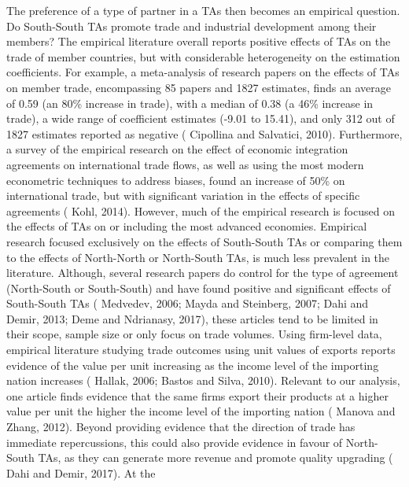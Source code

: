 \documentclass[12pt]{article}%
\begin{document}
%
The preference of a type of partner in a TAs then becomes an empirical
question. Do South-South TAs promote trade and industrial development
among their members? The empirical literature overall reports positive
effects of TAs on the trade of member countries, but with considerable
heterogeneity on the estimation coefficients. For example, a
meta-analysis of research papers on the effects of TAs on member trade,
encompassing 85 papers and 1827 estimates, finds an average of 0.59 (an
80\% increase in trade), with a median of 0.38 (a 46\% increase in
trade), a wide range of coefficient estimates (-9.01 to 15.41), and only
312 out of 1827 estimates reported as negative (\cite{cipollina_reciprocal_2010} Cipollina and Salvatici,
2010). Furthermore, a survey of the empirical research on the effect of
economic integration agreements on international trade flows, as well as
using the most modern econometric techniques to address biases, found an
increase of 50\% on international trade, but with significant variation
in the effects of specific agreements (\cite{kohl_we_2014} Kohl, 2014). However, much of the
empirical research is focused on the effects of TAs on or including the
most advanced economies. Empirical research focused exclusively on the
effects of South-South TAs or comparing them to the effects of
North-North or North-South TAs, is much less prevalent in the
literature. Although, several research papers do control for the type of
agreement (North-South or South-South) and have found positive and
significant effects of South-South TAs (\cite{medvedev_preferential_2006} Medvedev, 2006; \cite{mayda_south-south_2007} Mayda and
Steinberg, 2007; \cite{dahi_preferential_2013} Dahi and Demir, 2013; \cite{deme_trade-creation_2017} Deme and Ndrianasy, 2017), these
articles tend to be limited in their scope, sample size or only focus on
trade volumes. Using firm-level data, empirical literature studying
trade outcomes using unit values of exports reports evidence of the
value per unit increasing as the income level of the importing nation
increases (\cite{hallak_product_2006} Hallak, 2006; \cite{bastos_quality_2010} Bastos and Silva, 2010). Relevant to our
analysis, one article finds evidence that the same firms export their
products at a higher value per unit the higher the income level of the
importing nation (\cite{manova_export_2012} Manova and Zhang, 2012). Beyond providing evidence
that the direction of trade has immediate repercussions, this could also
provide evidence in favour of North-South TAs, as they can generate more
revenue and promote quality upgrading (\cite{dahi_south-south_2017} Dahi and Demir, 2017). At the
\end{document}
